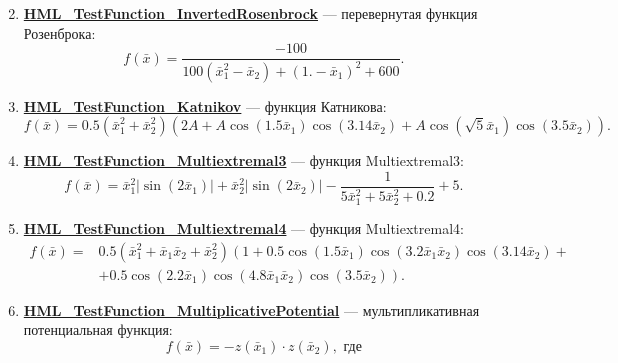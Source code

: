 \begin{enumerate}
\begin{equation}
 \end{equation}
 \item \hyperref[TestFunctions:section:HML_TestFunction_InvertedRosenbrock]{\textbf{HML\_TestFunction\_InvertedRosenbrock}} --- перевернутая функция Розенброка:
 \begin{equation}
 f\left( \bar{x}\right) =\dfrac{-100}{100\left( \bar{x}_1^2-\bar{x}_2\right) +\left( 1.-\bar{x}_1\right)^2+600}.
 \end{equation}
 \item \hyperref[TestFunctions:section:HML_TestFunction_Katnikov]{\textbf{HML\_TestFunction\_Katnikov}} --- функция Катникова:
 \begin{equation}
 f\left( \bar{x}\right) = 0.5\left( \bar{x}_1^2+\bar{x}_2^2\right) \left( 2A+A\cos\left( 1.5\bar{x}_1\right)\cos\left( 3.14\bar{x}_2\right)+A\cos\left( \sqrt{5}\bar{x}_1\right)\cos\left( 3.5\bar{x}_2\right)    \right).
 \end{equation}
 \item \hyperref[TestFunctions:section:HML_TestFunction_Multiextremal3]{\textbf{HML\_TestFunction\_Multiextremal3}} --- функция Multiextremal3:
 \begin{equation}
 f\left( \bar{x}\right) = \bar{x}_1^2\left| \sin\left( 2\bar{x}_1\right) \right| +\bar{x}_2^2\left| \sin\left( 2\bar{x}_2\right) \right| -\dfrac{1}{5\bar{x}_1^2+5\bar{x}_2^2+0.2} + 5.
 \end{equation}
 \item \hyperref[TestFunctions:section:HML_TestFunction_Multiextremal4]{\textbf{HML\_TestFunction\_Multiextremal4}} --- функция Multiextremal4:
 \begin{align}
 f\left( \bar{x}\right) =& 0.5\left( \bar{x}_1^2+\bar{x}_1\bar{x}_2 +\bar{x}_2^2\right) \left( 1+0.5\cos\left(1.5\bar{x}_1\right)\cos\left(3.2\bar{x}_1\bar{x}_2\right)\cos\left(3.14\bar{x}_2\right)  +\right. \\
  & \left.+0.5\cos\left(2.2\bar{x}_1\right)\cos\left(4.8\bar{x}_1\bar{x}_2\right)\cos\left(3.5\bar{x}_2\right)\right).\nonumber
 \end{align}
 \item \hyperref[TestFunctions:section:HML_TestFunction_MultiplicativePotential]{\textbf{HML\_TestFunction\_MultiplicativePotential}} --- мультипликативная потенциальная функция:
 \begin{equation}
 f\left( \bar{x}\right) = -z\left( \bar{x}_1\right)\cdot z\left( \bar{x}_2\right), \text{ где}
 \end{equation}
 \begin{equation*}

\end{equation*}
\end{enumerate}
